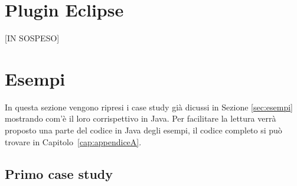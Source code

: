 \section{Plugin Eclipse}
\label{sec:plugin_eclipse}


[IN SOSPESO]


\section{Esempi}
\label{sec:implementazione_esempi}

In questa sezione vengono ripresi i case study già dicussi in Sezione \ref{sec:esempi} mostrando com'è il loro corrispettivo in Java. 
Per facilitare la lettura verrà proposto una parte del codice in Java degli esempi, il codice completo si può trovare in Capitolo~\ref{cap:appendiceA}.


\subsection{Primo case study}
\label{sub:primo_std_java}


